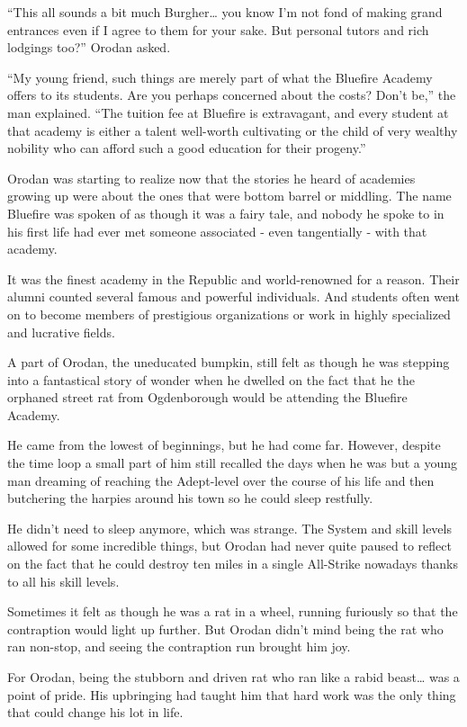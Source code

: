 \documentclass[a4paper,10pt]{book}
\begin{document}
“This all sounds a bit much Burgher… you know I’m not fond of making grand entrances even if I agree to them for your sake. But personal tutors and rich lodgings too?” Orodan asked.\par
“My young friend, such things are merely part of what the Bluefire Academy offers to its students. Are you perhaps concerned about the costs? Don’t be,” the man explained. “The tuition fee at Bluefire is extravagant, and every student at that academy is either a talent well-worth cultivating or the child of very wealthy nobility who can afford such a good education for their progeny.”\par
Orodan was starting to realize now that the stories he heard of academies growing up were about the ones that were bottom barrel or middling. The name Bluefire was spoken of as though it was a fairy tale, and nobody he spoke to in his first life had ever met someone associated - even tangentially - with that academy.\par
It was the finest academy in the Republic and world-renowned for a reason. Their alumni counted several famous and powerful individuals. And students often went on to become members of prestigious organizations or work in highly specialized and lucrative fields.\par
A part of Orodan, the uneducated bumpkin, still felt as though he was stepping into a fantastical story of wonder when he dwelled on the fact that he the orphaned street rat from Ogdenborough would be attending the Bluefire Academy.\par
He came from the lowest of beginnings, but he had come far. However, despite the time loop a small part of him still recalled the days when he was but a young man dreaming of reaching the Adept-level over the course of his life and then butchering the harpies around his town so he could sleep restfully.\par
He didn’t need to sleep anymore, which was strange. The System and skill levels allowed for some incredible things, but Orodan had never quite paused to reflect on the fact that he could destroy ten miles in a single All-Strike nowadays thanks to all his skill levels.\par
Sometimes it felt as though he was a rat in a wheel, running furiously so that the contraption would light up further. But Orodan didn’t mind being the rat who ran non-stop, and seeing the contraption run brought him joy.\par
For Orodan, being the stubborn and driven rat who ran like a rabid beast… was a point of pride. His upbringing had taught him that hard work was the only thing that could change his lot in life.\par
\end{document}
